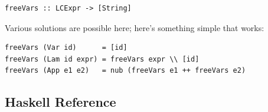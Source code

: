 \documentclass[addpoints]{exam}
\begin{document}
\begin{questions}
\begin{verbatim}
freeVars :: LCExpr -> [String]
\end{verbatim}
\begin{solutionorbox}[\stretch{1}]
Various solutions are possible here; here's something simple that works:
\begin{verbatim}
freeVars (Var id)      = [id]
freeVars (Lam id expr) = freeVars expr \\ [id]
freeVars (App e1 e2)   = nub (freeVars e1 ++ freeVars e2)
\end{verbatim}
\end{solutionorbox}

\end{questions}

\newpage

\subsection*{Haskell Reference}
\end{document}
